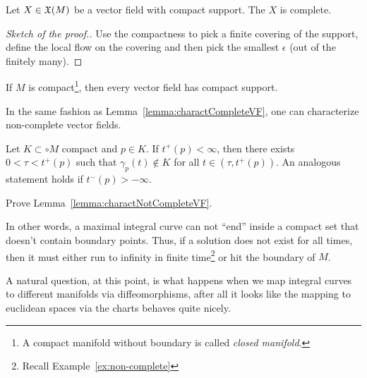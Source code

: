 \begin{corollary}
  Let $X\in\mathfrak{X}(M)$ be a vector field with compact support. The $X$ is complete.
\end{corollary}
\begin{proof}[Sketch of the proof.]
  Use the compactness to pick a finite covering of the support, define the local flow on the covering and then pick the smallest $\epsilon$ (out of the finitely many).
\end{proof}

\begin{corollary}
  If $M$ is compact\footnote{A compact manifold without boundary is called \emph{closed manifold}.}, then every vector field has compact support.
\end{corollary}

In the same fashion as Lemma~\ref{lemma:charactCompleteVF}, one can characterize non-complete vector fields.

\begin{lemma}\label{lemma:charactNotCompleteVF}
  Let $K\subset \circ M$ compact and $p\in K$.
  If $t^+(p) < \infty$, then there exists $0<\tau<t^+(p)$ such that $\gamma_p(t)\not\in K$ for all $t\in (\tau, t^+(p))$.
  An analogous statement holds if $t^-(p) > -\infty$.
\end{lemma}

\begin{exercise}
  Prove Lemma~\ref{lemma:charactNotCompleteVF}.
\end{exercise}

In other words, a maximal integral curve can not ``end'' inside a compact set that doesn't contain boundary points.
Thus, if a solution does not exist for all times, then it must either run to infinity in finite time\footnote{Recall Example~\ref{ex:non-complete}} or hit the boundary of $M$.

A natural question, at this point, is what happens when we map integral curves to different manifolds via diffeomorphisms, after all it looks like the mapping to euclidean spaces via the charts behaves quite nicely.

